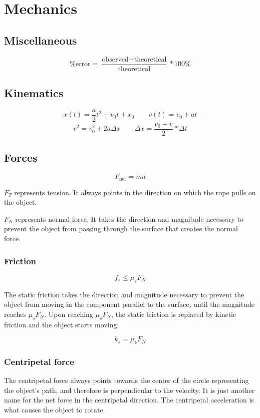 \chapter{Mechanics}

\section{Miscellaneous}

\[
	\text{\% error} = \frac{\text{observed} - \text{theoretical}}{\text{theoretical}} * 100\%
\]

\section{Kinematics}

\[
	x(t) = \frac{a}{2}t^2 + v_0 t + x_0 \qquad
	v(t) = v_0 + at
\]\[
	v^2 = v_0^2 + 2a\Delta x \qquad
	\Delta x = \frac{v_0 + v}{2} * \Delta t
\]

\section{Forces}

\[
	F_\text{net} = ma
\]

$F_T$ represents tension. It always points in the direction on which the rope pulls on the object.

$F_N$ represents normal force. It takes the direction and magnitude necessary to prevent the object from passing through the surface that creates the normal force.

\subsection{Friction}

\[
	f_s \leq \mu_s F_N
\]

The static friction takes the direction and magnitude necessary to prevent the object from moving in the component parallel to the surface, until the magnitude reaches $\mu_s F_N$. Upon reaching $\mu_s F_N$, the static friction is replaced by kinetic friction and the object starts moving:

\[
	k_s = \mu_k F_N
\]

\subsection{Centripetal force}

The centripetal force always points towards the center of the circle representing the object's path, and therefore is perpendicular to the velocity. It is just another name for the net force in the centripetal direction. The centripetal acceleration is what causes the object to rotate.

